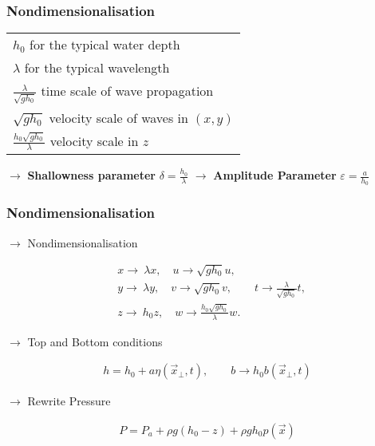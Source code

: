 \documentclass[fleqn]{beamer}
\newcommand{\tabitem}{%
  \usebeamertemplate{itemize item}\hspace*{\labelsep}}
\begin{document}
    \begin{frame}
        \frametitle{Nondimensionalisation}
        \begin{center}
        \begin{tabular}{@{}l@{}}
                \tabitem $h_0$ for the typical water depth\\
                \tabitem $\lambda$ for the typical wavelength\\
                \tabitem $\frac{\lambda}{\sqrt{g h_0}}$ time scale
                of wave propagation\\
                \tabitem $\sqrt{g h_0}$ velocity scale of waves in
                $(x, y)$\\
                \tabitem $\frac{h_0 \sqrt{g h_0} }{\lambda}$ velocity scale in $z$
        \end{tabular}
        \end{center}
        \centering
        $\rightarrow$ \textbf{Shallowness parameter} $\delta =
        \frac{h_0}{\lambda}$
        \centering
        $\rightarrow$ \textbf{Amplitude Parameter}
        $\varepsilon=\frac{a}{h_0}$
    \end{frame}

    \begin{frame}
        \frametitle{Nondimensionalisation}
        $\rightarrow$ Nondimensionalisation
        \begin{ceqn}
        \begin{align}
            &x \rightarrow\ \lambda x, \quad u \rightarrow \sqrt{gh_0} u,
            \nonumber \\
              &y \rightarrow\ \lambda y, \quad v \rightarrow \sqrt{gh_0} v, \qquad
              t\rightarrow \frac{\lambda}{\sqrt{gh_0}}t,\nonumber\\
              &z \rightarrow\ h_0 z, \quad w \rightarrow
            \frac{h_0\sqrt{gh_0}}{\lambda} w.\nonumber
        \end{align}
        \end{ceqn}
        \centering
        $\rightarrow$ Top and Bottom conditions
        \begin{ceqn}
        \begin{align}
        h = h_0 + a \eta(\vec{x}_\perp,t), \qquad  b \rightarrow h_0
        b(\vec{x}_\perp, t)\nonumber
        \end{align}
        \end{ceqn}
        \centering
        $\rightarrow$ Rewrite Pressure
        \begin{ceqn}
        \begin{align}
            P = P_a + \rho g(h_0 -z) + \rho g h_0 p(\vec{x})  \nonumber
        \end{align}
        \end{ceqn}
    \end{frame}
\end{document}
